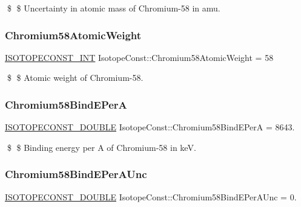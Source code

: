 \$ \$ Uncertainty in atomic mass of Chromium-\/58 in amu. \mbox{\label{group___isotope_const-_chromium-_cr58_ga0b3bb6a9a713a6ad50ed5abf50e31150}} 
\subsubsection{\texorpdfstring{Chromium58\+Atomic\+Weight}{Chromium58AtomicWeight}}
{\footnotesize\ttfamily \mbox{\hyperlink{group___isotope_const-_macros_ga5f18360b3e99483a35c32d789e62621c}{I\+S\+O\+T\+O\+P\+E\+C\+O\+N\+S\+T\+\_\+\+I\+NT}} Isotope\+Const\+::\+Chromium58\+Atomic\+Weight = 58}

\$ \$ Atomic weight of Chromium-\/58. \mbox{\label{group___isotope_const-_chromium-_cr58_ga6290a3f1c02102e20bd75d312019422a}} 
\subsubsection{\texorpdfstring{Chromium58\+Bind\+E\+PerA}{Chromium58BindEPerA}}
{\footnotesize\ttfamily \mbox{\hyperlink{group___isotope_const-_macros_ga8f45a7272ce02c0b4c65c44636ed719a}{I\+S\+O\+T\+O\+P\+E\+C\+O\+N\+S\+T\+\_\+\+D\+O\+U\+B\+LE}} Isotope\+Const\+::\+Chromium58\+Bind\+E\+PerA = 8643.}

\$ \$ Binding energy per A of Chromium-\/58 in keV. \mbox{\label{group___isotope_const-_chromium-_cr58_ga778e2220d2c4196477703e96fe6886c9}} 
\subsubsection{\texorpdfstring{Chromium58\+Bind\+E\+Per\+A\+Unc}{Chromium58BindEPerAUnc}}
{\footnotesize\ttfamily \mbox{\hyperlink{group___isotope_const-_macros_ga8f45a7272ce02c0b4c65c44636ed719a}{I\+S\+O\+T\+O\+P\+E\+C\+O\+N\+S\+T\+\_\+\+D\+O\+U\+B\+LE}} Isotope\+Const\+::\+Chromium58\+Bind\+E\+Per\+A\+Unc = 0.}

